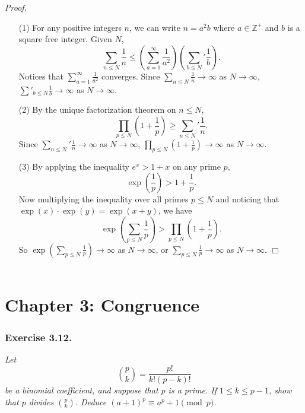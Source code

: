 \documentclass{article}
\begin{document}
\emph{Proof.}
\begin{enumerate}
\item[(1)]
For any positive integers $n$, we can write $n = a^2 b$ where $a \in \mathbb{Z}^+$ and
$b$ is a square free integer.
Given $N$,
$$\sum_{n \leq N} \frac{1}{n}
\leq \left(\sum_{a = 1}^{\infty} \frac{1}{a^2} \right)
\left( {\sum_{b \leq N}}' \frac{1}{b} \right).$$
Notices that $\sum_{a = 1}^{\infty} \frac{1}{a^2}$ converges.
Since $\sum_{n \leq N} \frac{1}{n} \rightarrow \infty$ as $N \rightarrow \infty$,
$\sum'_{b \leq N}\frac{1}{b} \rightarrow \infty$ as $N \rightarrow \infty$.
\item[(2)]
By the unique factorization theorem on $n \leq N$,
$$\prod_{p \leq N} \left( 1 + \frac{1}{p} \right)
\geq {\sum_{n \leq N}}' \frac{1}{n}.$$
Since ${\sum_{n \leq N}}' \frac{1}{n} \rightarrow \infty$ as $N \rightarrow \infty$,
$\prod_{p \leq N} ( 1 + \frac{1}{p} ) \rightarrow \infty$ as $N \rightarrow \infty$.
\item[(3)]
By applying the inequality $e^x > 1 + x$ on any prime $p$,
$$\exp\left(\frac{1}{p}\right) > 1 + \frac{1}{p}.$$
Now multiplying the inequality over all primes $p \leq N$ and noticing that
$\exp(x) \cdot \exp(y) = \exp(x + y)$, we have
$$\exp\left(\sum_{p \leq N} \frac{1}{p} \right)
> \prod_{p \leq N} \left( 1 + \frac{1}{p} \right).$$
So
$\exp\left(\sum_{p \leq N} \frac{1}{p} \right) \rightarrow \infty$ as $N \rightarrow \infty$, or
$\sum_{p \leq N} \frac{1}{p} \rightarrow \infty$ as $N \rightarrow \infty$.
$\Box$ \\\\
\end{enumerate}






\newpage
\section*{Chapter 3: Congruence \\}



\subsubsection*{Exercise 3.12.}
\emph{Let $${p \choose k} = \frac{p!}{k!(p-k)!}$$
be a binomial coefficient, and suppose that $p$ is a prime.
If $1 \leq k \leq p-1$, show that $p$ divides ${p \choose k}$.
Deduce $(a+1)^p \equiv a^p + 1 \pmod{p}$.} \\
\end{document}
